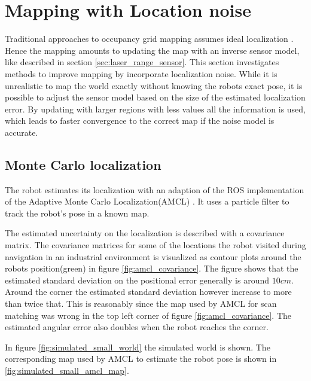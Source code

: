 \section{Mapping with Location noise}
\label{sec:mapping_with_location_noise}

Traditional approaches to occupancy grid mapping assumes ideal localization \cite{probRob}. 
Hence the mapping amounts to updating the map with an inverse sensor model, like described in section \vref{sec:laser_range_sensor}.
This section investigates methods to improve mapping by incorporate localization noise.
While it is unrealistic to map the world exactly without knowing the robots exact pose, it is possible to adjust the sensor model based on the size of the estimated localization error.
By updating with larger regions with less values all the information is used, which leads to faster convergence to the correct map if the noise model is accurate.

\subsection{Monte Carlo localization}
The robot estimates its localization with an adaption of the ROS implementation \cite{ros_amcl} of the Adaptive Monte Carlo Localization(AMCL) \cite{Thrun200199}. It uses a particle filter to track the robot's pose in a known map. 

The estimated uncertainty on the localization is described with a covariance matrix. The covariance matrices for some of the locations the robot visited during navigation in an industrial environment is visualized as contour plots around the robots position(green) in figure \vref{fig:amcl_covariance}. 
The figure shows that the estimated standard deviation on the positional error generally is around $10cm$. Around the corner the estimated standard deviation however increase to more than twice that. This is reasonably since the map used by AMCL for scan matching was wrong in the top left corner of figure \vref{fig:amcl_covariance}. The estimated angular error also doubles when the robot reaches the corner.

In figure \vref{fig:simulated_small_world} the simulated world is shown. The corresponding map used by AMCL to estimate the robot pose is shown in \vref{fig:simulated_small_amcl_map}.

